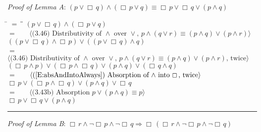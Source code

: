 \documentclass[12pt, fleqn, leqno]{article}
\newcommand{\lgap}{2pt}                             %
\newcommand{\mymathindent}{24pt}                    %
\newcommand{\impl}{\ensuremath{\Rightarrow}}        %
\newcommand{\Always}{\Box\,}
\newcommand{\myqed}{\rule[-.23ex]{1.2ex}{2.0ex}}
\newcommand{\myqedtab}{\hspace{384pt}}              %
\newcommand{\Gll} {\langle}                         %
\newcommand{\Ggg} {\rangle}                         %
\newcommand{\Hint}[1]     {\ \ \ $\Gll              \mbox{#1} \Ggg$ }   %
\begin{document}
\emph{Proof of Lemma A}:
$(p \lor \Always q) \land (\Always p \lor q) \equiv \Always p \lor \Always q \lor (p \land q)$
\begin{tabbing}
\hspace{\mymathindent} \= $= \;$ \= \myqedtab \= \kill
  \> \>   $(p \lor \Always q) \land (\Always p \lor q)$\\[\lgap]
  \> $=$ \> \Hint{(3.46) Distributivity of $\land$ over $\lor$, $p\land (q\lor r)\equiv (p\land q)\lor (p\land r)$} \\[\lgap]
  \> \>   $((p \lor \Always q) \land \Always p) \lor ((p \lor \Always q) \land q)$\\[\lgap]
   \> $=$ \> \Hint{(3.46) Distributivity of $\land$ over $\lor$, $p\land (q\lor r)\equiv (p\land q)\lor (p\land r)$, twice} \\[\lgap]
  \> \>   $(\Always p \land p) \lor (\Always p \land \Always q) \lor (p \land q) \lor (\Always q \land q)$\\[\lgap]
  \> $=$  \>  \Hint{(\ref{E:absAndIntoAlways}) Absorption of $\land$ into $\Always$, twice}\\[\lgap]
  \> \>   $\Always p \lor (\Always p \land \Always q) \lor (p \land q) \lor \Always q $\\[\lgap]
  \> $=$ \> \Hint{(3.43b) Absorption $p \lor (p \land q) \equiv p$} \\[\lgap]
  \> \>   $\Always p \lor \Always q \lor (p \land q)$ \quad \myqed
\end{tabbing}
\emph{Proof of Lemma B}:
$\Always r \land \neg \Always p \land \neg \Always q  \impl \Always (\Always r \land \neg \Always p \land \neg \Always q )$
\end{document}
